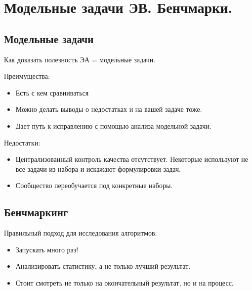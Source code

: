 \section{Модельные задачи ЭВ. Бенчмарки.}

\subsection*{Модельные задачи}

Как доказать полезность ЭА = модельные задачи.


Преимущества:
\begin{itemize}
    \item Есть с кем сравниваться
    \item Можно делать выводы о недостатках и на вашей задаче тоже.
    \item Дает путь к исправлению с помощью анализа модельной задачи.
\end{itemize}

Недостатки:
\begin{itemize}
    \item Централизованный контроль качества отсутствует.
    Некоторые используют не все задачи из набора и искажают
    формулировки задач.
    \item Сообщество переобучается под конкретные наборы.
\end{itemize}

\subsection*{Бенчмаркинг}

Правильный подход для исследования алгоритмов:
\begin{itemize}
    \item Запускать много раз!
    \item Анализировать статистику, а не только лучший результат.
    \item Стоит смотреть не только на окончательный результат, но
    и на процесс.
\end{itemize}
